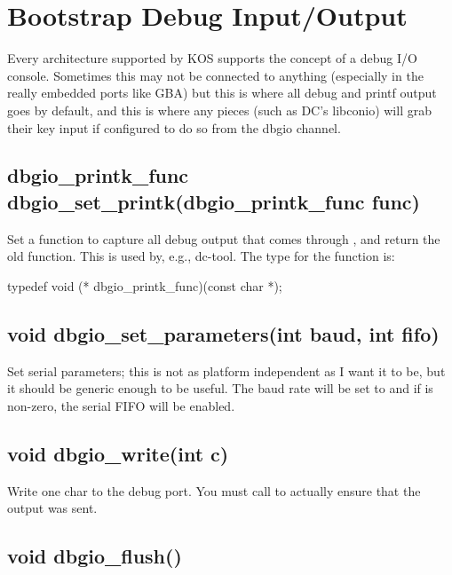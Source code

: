 \documentclass[english]{report}
\newenvironment{lyxcode}
   {\begin{list}{}{
     \setlength{\rightmargin}{\leftmargin}
     \raggedright
     \setlength{\itemsep}{0pt}
     \setlength{\parsep}{0pt}
     \normalfont\ttfamily}%
    \item[]}
   {\end{list}}
\begin{document}

\section{Bootstrap Debug Input/Output}

Every architecture supported by KOS supports the concept of a debug
I/O console. Sometimes this may not be connected to anything (especially
in the really embedded ports like GBA) but this is where all debug
and printf output goes by default, and this is where any pieces (such
as DC's libconio) will grab their key input if configured to do so
from the dbgio channel.


\subsection{dbgio\_printk\_func dbgio\_set\_printk(dbgio\_printk\_func func)}

Set a function to capture all debug output that comes through ,
and return the old function. This is used by, e.g., dc-tool. The type for
the function is:

\begin{lyxcode}
typedef void (* dbgio\_printk\_func)(const char *);
\end{lyxcode}


\subsection{void dbgio\_set\_parameters(int baud, int fifo)}

Set serial parameters; this is not as platform independent as  I want
it to be, but it should be generic enough to be useful. The
baud rate will be set to  and if 
is non-zero, the serial FIFO will be enabled.


\subsection{void dbgio\_write(int c)}

Write one char to the debug port. You must call 
to actually ensure that the output was sent.


\subsection{void dbgio\_flush()}
\end{document}

